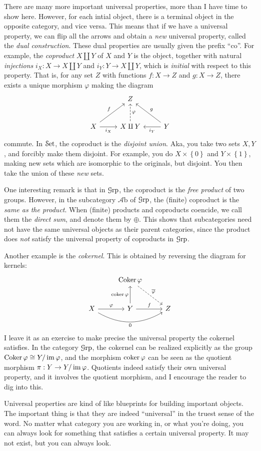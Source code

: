 There are many more important universal properties, more than I have time to show here. However, for each intial object, there is a terminal object in the opposite category, and vice versa. This means that if we have a universal property, we can flip all the arrows and obtain a \emph{new} universal property, called the \emph{dual construction}. These dual properties are usually given the prefix ``co''. For example, the \emph{coproduct}  $X\amalg Y$ of $X$ and $Y$ is the object, together with natural \emph{injections} $i_X : X \to X\amalg Y$ and $i_Y : Y \to X\amalg Y$, which is \emph{initial} with respect to this property. That is, for any set $Z$ with functions $f : X \to Z$ and $g : X \to Z$, there exists a unique morphism $\varphi $ making the diagram
\[\begin{tikzcd}[row sep = 2.5em, column sep = 2.5em]
 & Z &  \\
X\ar[" i_X "', r] \ar[" f ", ur]  & X\amalg Y \ar[dashed, " \varphi  "', u]  & Y\ar[" i_Y ", l] \ar[" g "', ul] 
\end{tikzcd}\]
commute. In $\mathcal{S}\mathrm{et} $, the coproduct is the \emph{disjoint union}. Aka, you take two sets $X,Y$, and forcibly make them disjoint. For example, you do $X\times \left\{ 0 \right\} $ and $Y\times \left\{ 1 \right\} $, making new sets which are isomorphic to the originals, but disjoint. You then take the union of these \emph{new} sets.

One interesting remark is that in $\mathcal{G}\mathrm{rp} $, the coproduct is the \emph{free product} of two groups. However, in the subcategory $\mathcal{A} \mathrm{b} $ of $\mathcal{G}\mathrm{rp} $, the (finite) coproduct is the \emph{same as the product}. When (finite) products and coproducts coencide, we call them the \emph{direct sum}, and denote them by $\oplus$. This shows that subcategories need not have the same universal objects as their parent categories, since the product does \emph{not} satisfy the universal property of coproducts in $\mathcal{G}\mathrm{rp} $.

Another example is the \emph{cokernel}. This is obtained by reversing the diagram for kernels:
\[\begin{tikzcd}[row sep = 2.5em, column sep = 2.5em]
 & \operatorname{Coker} \varphi \ar[" \overline{\varphi }  ", dashed, dr]  &  \\
X\ar[bend right, " 0 "', rr] \ar[" \varphi  ", r]  & Y\ar[" f ", r] \ar[" \coker \varphi  ", u]  & Z
\end{tikzcd}\]
I leave it as an exercise to make precise the universal property the cokernel satisfies. In the category $\mathcal{G}\mathrm{rp} $, the cokernel can be realized explicitly as the group $\operatorname{Coker} \varphi \cong Y/\operatorname{im} \varphi $, and the morphism $\operatorname{coker} \varphi $ can be seen as the quotient morphism $\pi : Y \to Y/\operatorname{im} \varphi $. Quotients indeed satisfy their own universal property, and it involves the quotient morphism, and I encourage the reader to dig into this.

Universal properties are kind of like blueprints for building important objects. The important thing is that they are indeed ``universal'' in the truest sense of the word. No matter what category you are working in, or what you're doing, you can always look for something that satisfies a certain universal property. It may not exist, but you can always look.

